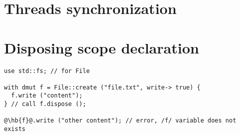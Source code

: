 \vfill%
\pagebreak

\section{Threads synchronization}
\label{sec:thread_sync}

\vfill%
\pagebreak

\section{Disposing scope declaration}%
\label{sec:dispose_block}

\begin{lstlisting}[style=coloredverbatim, escapechar=@]
use std::fs; // for File

with dmut f = File::create ("file.txt", write-> true) {
  f.write ("content");
} // call f.dispose ();

@\hb{f}@.write ("other content"); // error, /f/ variable does not exists
\end{lstlisting}
